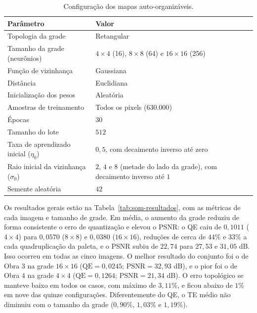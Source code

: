 \documentclass[11pt,a4paper]{article}
\begin{document}
\begin{table}[htbp]
  \centering
  \small
  \begin{tabular}{ll}
    \toprule
    Parâmetro & Valor \\
    \midrule
    Topologia da grade & Retangular \\
    Tamanho da grade (neurônios) & $4 \times 4$ (16), $8 \times 8$ (64) e $16 \times 16$ (256) \\
    Função de vizinhança & Gaussiana \\
    Distância & Euclidiana \\
    Inicialização dos pesos & Aleatória \\
    Amostras de treinamento & Todos os pixels ($630.000$) \\
    Épocas & $30$ \\
    Tamanho do lote & $512$ \\
    Taxa de aprendizado inicial ($\eta_0$) & $0{,}5$, com decaimento inverso até zero \\
    Raio inicial da vizinhança ($\sigma_0$) & $2$, $4$ e $8$ (metade do lado da grade), com decaimento inverso até $1$ \\
    Semente aleatória & $42$ \\
    \bottomrule
    
  \end{tabular}
  \caption{Configuração dos mapas auto-organizáveis.}
  \label{tab:som-config}
\end{table}

Os resultados gerais estão na Tabela~\ref{tab:som-resultados}, com as métricas de
cada imagem e tamanho de grade. Em média, o aumento da grade reduziu de forma
consistente o erro de quantização e elevou o PSNR: o QE caiu de $0{,}1011$
($4 \times 4$) para $0{,}0570$ ($8 \times 8$) e $0{,}0380$ ($16 \times 16$), reduções
de cerca de $44\%$ e $33\%$ a cada quadruplicação da paleta, e o PSNR subiu de
$22{,}74$ para $27{,}53$ e $31{,}05$ dB. Isso ocorreu em todas as cinco imagens. O
melhor resultado do conjunto foi o de Obra 3 na grade
$16 \times 16$ ($\mathrm{QE} = 0{,}0245$; $\mathrm{PSNR} = 32{,}93$ dB), e o pior foi o de
Obra 4 na grade $4 \times 4$
($\mathrm{QE} = 0{,}1264$; $\mathrm{PSNR} = 21{,}34$ dB). O erro topológico se manteve
baixo em todos os casos, com máximo de $3{,}11\%$, e ficou abaixo de $1\%$ em nove
das quinze configurações. Diferentemente do QE, o TE médio não diminuiu com o
tamanho da grade ($0{,}90\%$, $1{,}03\%$ e $1{,}19\%$).
\end{document}
